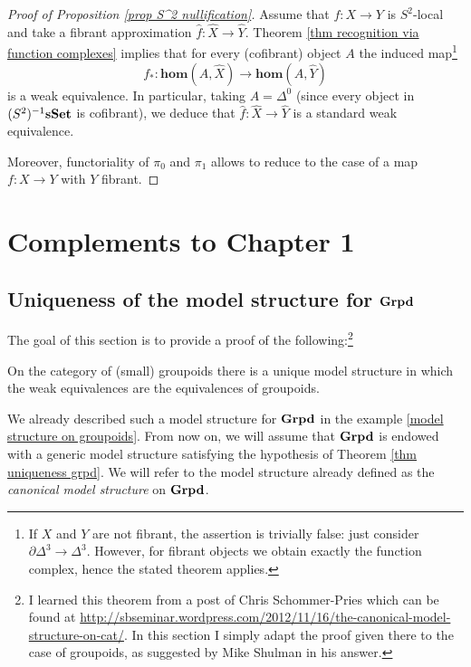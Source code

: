 \begin{proof}[Proof of Proposition \ref{prop S^2 nullification}]
Assume that $f \colon X \to Y$ is $S^2$-local and take a fibrant approximation $\widehat{f} \colon \widehat{X} \to \widehat{Y}$. Theorem \ref{thm recognition via function complexes} implies that for every (cofibrant) object $A$ the induced map\footnote{If $X$ and $Y$ are not fibrant, the assertion is trivially false: just consider $\partial \Delta^3 \to \Delta^3$. However, for fibrant objects we obtain exactly the function complex, hence the stated theorem applies.}
\[
f_* \colon \mathbf{hom}(A,\widehat{X}) \to \mathbf{hom}(A,\widehat{Y})
\]
is a weak equivalence. In particular, taking $A = \Delta^0$ (since every object in $(S^2)^{-1} \mathbf{sSet}$ is cofibrant), we deduce that $\widehat{f} \colon \widehat{X} \to \widehat{Y}$ is a standard weak equivalence.

Moreover, functoriality of $\pi_0$ and $\pi_1$ allows to reduce to the case of a map $f \colon X \to Y$ with $Y$ fibrant.
\end{proof}

\section{Complements to Chapter 1}

\subsection{Uniqueness of the model structure for $\mathbf{Grpd}$}

The goal of this section is to provide a proof of the following:\footnote{I learned this theorem from a post of Chris Schommer-Pries which can be found at \url{http://sbseminar.wordpress.com/2012/11/16/the-canonical-model-structure-on-cat/}. In this section I simply adapt the proof given there to the case of groupoids, as suggested by Mike Shulman in his answer.}

\begin{thm} \label{thm uniqueness grpd}
On the category of (small) groupoids there is a unique model structure in which the weak equivalences are the equivalences of groupoids.
\end{thm}

We already described such a model structure for $\mathbf{Grpd}$ in the example \ref{model structure on groupoids}. From now on, we will assume that $\mathbf{Grpd}$ is endowed with a generic model structure satisfying the hypothesis of Theorem \ref{thm uniqueness grpd}. We will refer to the model structure already defined as the \emph{canonical model structure} on $\mathbf{Grpd}$.

